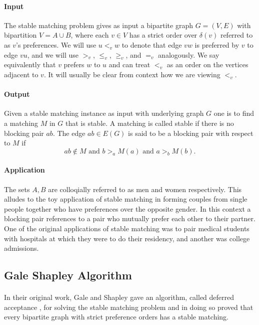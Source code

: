 \paragraph{Input}The stable matching problem gives as input a bipartite graph $G=(V, E)$ with bipartition $V = A\cup B$, where each $v \in V$ has a strict order over $\delta(v)$ referred to as $v$'s preferences. We will use $u <_v w$ to denote that edge $vw$ is preferred by $v$ to edge $vu$, and we will use $>_v$, $\leq_v$, $\geq_v$, and $=_v$ analogously. We say equivalently that $v$ prefers $w$ to $u$ and can treat $<_v$ as an order on the vertices adjacent to $v$. It will usually be clear from context how we are viewing $<_v$.
\paragraph{Output} Given a stable matching instance as input with underlying graph $G$ one is to find a matching $M$ in $G$ that is stable. A matching is called stable if there is no blocking pair $ab$. The edge $ab \in E(G)$ is said to be a blocking pair with respect to $M$ if 
$$ab \not\in M \text{ and } b >_a M(a) \text{ and } a >_b M(b).$$
\paragraph{Application} The sets $A,B$ are colloqially referred to as men and women respectively. This alludes to the toy application of stable matching in forming couples from single people together who have preferences over the opposite gender. In this context a blocking pair references to a pair who mutually prefer each other to their partner. One of the original applications of stable matching \cite{roth1984evolution} was to pair medical students with hospitals at which they were to do their residency, and another was college admissions.
\subsection{Gale Shapley Algorithm}\label{SM:ALG}
\paragraph{}
In their original work, Gale and Shapley gave an algorithm, called deferred acceptance \cite{gale1962college}, for solving the stable matching problem and in doing so proved that every bipartite graph with strict preference orders has a stable matching.
